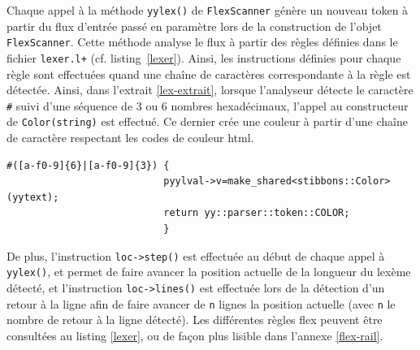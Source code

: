 Chaque appel à la méthode \verb|yylex()| de \verb|FlexScanner| génère un nouveau token à partir du flux d'entrée passé en paramètre lors de la construction de l'objet \verb|FlexScanner|. Cette méthode analyse le flux à partir des règles définies dans le fichier \verb|lexer.l+| (cf. listing~\ref{lexer}). Ainsi, les instructions définies pour chaque règle sont effectuées quand une chaîne de caractères correspondante à la règle est détectée. Ainsi, dans l'extrait \ref{lex-extrait}, lorsque l'analyseur détecte le caractère \verb|#| suivi d'une séquence de 3 ou 6 nombres hexadécimaux, l'appel au constructeur de \verb|Color(string)| est effectué. Ce dernier crée une couleur à partir d'une chaîne de caractère respectant les codes de couleur html.

\begin{lstlisting}[label=lex-extrait,caption=Exemple de séquence d'instruction lors de la détection d'une couleur]
#([a-f0-9]{6}|[a-f0-9]{3}) {
                           pyylval->v=make_shared<stibbons::Color>(yytext);
                           return yy::parser::token::COLOR;
                           }
\end{lstlisting}

De plus, l'instruction \verb|loc->step()| est effectuée au début de chaque appel à \verb|yylex()|, et permet de faire avancer la position actuelle de la longueur du lexème détecté, et l'instruction \verb|loc->lines()| est effectuée lors de la détection d'un retour à la ligne afin de faire avancer de \verb|n| lignes la position actuelle (avec \verb|n| le nombre de retour à la ligne détecté).
Les différentes règles flex peuvent être consultées au listing \ref{lexer}, ou de façon plus lisible dans l'annexe \ref{flex-rail}.
